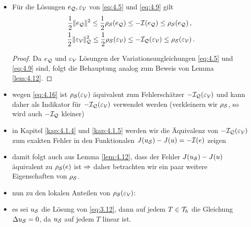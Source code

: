 \begin{itemize}
\item 
\begin{kor}
Für die Lösungen $e_{\mathcal Q}, \varepsilon_{\mathcal V}$ von \eqref{eq:4.5} und \eqref{eq:4.9} gilt
\begin{align}\label{eq:4.15}
	\frac 12 \lVert e_{\mathcal Q}\rVert^2 \le \frac 12 \rho_{\mathcal S}(e_{\mathcal Q})& \le -\mathcal I (e_{\mathcal Q}) \le \rho_{\mathcal S}(e_{\mathcal Q}) \, ,\\
	\label{eq:4.16}
	\frac 12 \lVert \varepsilon_{\mathcal V}\rVert_{\mathcal Q}^2 \le \frac 12 \rho_{\mathcal S}(\varepsilon_{\mathcal V})& \le -\mathcal I_{\mathcal Q} (\varepsilon_{\mathcal V}) \le \rho_{\mathcal S}(\varepsilon_{\mathcal V})\, .
\end{align}
\end{kor}

\begin{proof}
Da $e_{\mathcal Q}$ und $\varepsilon_{\mathcal V}$ Lösungen der Variationsungleichungen \eqref{eq:4.5} und \eqref{eq:4.9} sind, folgt die Behauptung analog zum Beweis von Lemma \ref{lem:4.12}.
\end{proof}

\item wegen \eqref{eq:4.16} ist $\rho_{\mathcal S} (\varepsilon_{\mathcal V})$ äquivalent zum Fehlerschätzer $-\mathcal I_{\mathcal Q}(\varepsilon_{\mathcal V})$ und kann daher als Indikator für $-\mathcal I_{\mathcal Q} (\varepsilon_{\mathcal V})$ verwendet werden (verkleinern wir $\rho_{\mathcal S}$, so wird auch $-\mathcal I_{\mathcal Q}$ kleiner)

\item in Kapitel \ref{kap:4.1.4} und \ref{kap:4.1.5} werden wir die Äquivalenz von $-\mathcal I_{\mathcal Q}(\varepsilon_{\mathcal V})$ zum exakten Fehler in den Funktionalen $J(u_{\mathcal S}) - J(u)=-\mathcal I(e)$ zeigen

\item damit folgt auch aus Lemma \ref{lem:4.12}, dass der Fehler $J(u_{\mathcal S})-J(u)$ äquivalent zu $\rho_{\mathcal S}(e)$ ist $\Rightarrow$ daher betrachten wir ein paar weitere Eigenschaften von $\rho_{\mathcal S}$.

\item nun zu den lokalen Anteilen von $\rho_{\mathcal S}(\varepsilon_{\mathcal V})$:

\item es sei $u_{\mathcal S}$ die Lösung von \eqref{eq:3.12}, dann auf jedem $T\in \mathcal T_h$ die Gleichung $\Delta u_{\mathcal S} = 0$, da $u_{\mathcal S}$ auf jedem $T$ linear ist.


\end{itemize}
